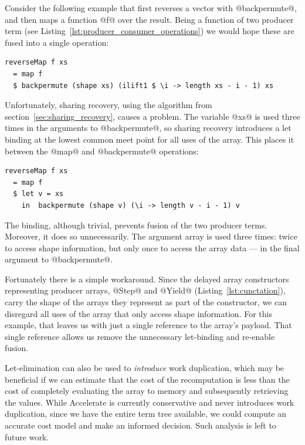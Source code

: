 Consider the following example that first reverses a vector with @backpermute@,
and then maps a function @f@ over the result. Being a function of two producer
term (see Listing~\ref{lst:producer_consumer_operations}) we would hope these
are fused into a single operation:%
%
\begin{lstlisting}[style=haskell]
reverseMap f xs
  = map f
  $ backpermute (shape xs) (ilift1 $ \i -> length xs - i - 1) xs
\end{lstlisting}
%
Unfortunately, sharing recovery, using the algorithm from
section~\ref{sec:sharing_recovery}, causes a problem. The variable @xs@
is used three times in the arguments to @backpermute@, so sharing recovery
introduces a let binding at the lowest common meet point for all uses of the
array. This places it between the @map@ and @backpermute@ operations:
%
\begin{lstlisting}[style=haskell]
reverseMap f xs
  = map f
  $ let v = xs
    in  backpermute (shape v) (\i -> length v - i - 1) v
\end{lstlisting}
%
The binding, although trivial, prevents fusion of the two producer terms.
Moreover, it does so unnecessarily. The argument array is used three times:
twice to access shape information, but only once to access the array data ---
in the final argument to @backpermute@.

Fortunately there is a simple workaround. Since the delayed array constructors
representing producer arrays, @Step@ and @Yield@ (Listing~\ref{lst:cunctation}),
carry the shape of the arrays they represent as part of the constructor, we can
disregard all uses of the array that only access shape information. For this
example, that leaves us with just a single reference to the array's payload.
That single reference allows us remove the unnecessary let-binding and re-enable
fusion.

Let-elimination can also be used to \emph{introduce} work duplication, which may
be beneficial if we can estimate that the cost of the recomputation is less than
the cost of completely evaluating the array to memory and subsequently
retrieving the values. While Accelerate is currently conservative and never
introduces work duplication, since we have the entire term tree available, we
could compute an accurate cost model and make an informed decision. Such
analysis is left to future work.


